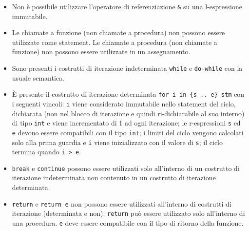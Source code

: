 \documentclass{report}
\newcommand{\term}[1]{\texttt{#1}}
\begin{document}
\begin {itemize}
\begin{itemize}
    \end{itemize}

    La dimensione di un array deve essere una r-espressione valutabile a compile-time,
    compatibile con il tipo intero e di valore positivo.

    Le costanti (\term{param}) sono considerate immutabili e definite a compile-time.
    Devono essere inizializzate solo da letterali o da r-espressioni valutabili
    a compile-time.

    Variabili e costanti sono visibili dal punto di dichiarazione fino alla fine
    del blocco, le funzioni sono visibili ovunque nel blocco di dichiarazione
    e nei blocchi al suo interno.

    Le funzioni (non procedure) devono ammettere un return in ogni path di esecuzione
    possibile.

    \item Non è possibile utilizzare l'operatore di referenziazione \term{&} su una
    l-espressione immutabile.

    \item Le chiamate a funzione (non chiamate a procedura) non possono essere utilizzate come
    statement. Le chiamate a procedura (non chiamate a funzione) non possono essere utilizzate in un
    assegnamento.

    \item Sono presenti i costrutti di iterazione indeterminata \term{while} e
    \term{do-while} con la usuale semantica.

    \item È presente il costrutto di iterazione determinata \texttt{for i in \{s .. e\}~stm}
    con i seguenti vincoli: \texttt{i} viene considerato immutabile nello statement del ciclo,
    dichiarata (non nel blocco di iterazione e quindi ri-dichiarabile al suo interno) di tipo 
    \term{int} e viene incrementato di 1 ad  ogni iterazione; le r-espressioni \texttt{s} 
    ed \texttt{e} devono essere  compatibili con il tipo \term{int}; i limiti del ciclo 
    vengono calcolati solo alla prima guardia e \texttt{i} viene inizializzato con il 
    valore di \texttt{s}; il ciclo termina quando \texttt{i > e}.

    \item \texttt{break} e \texttt{continue} possono essere utilizzati solo all'interno
    di un costrutto di iterazione indeterminata non contenuto in un costrutto di iterazione determinata.

    \item \texttt{return} e \texttt{return e} non possono essere utilizzati all'interno
    di costrutti di iterazione (determinata e non). \texttt{return} può essere utilizzato
    solo all'interno di una procedura. \texttt{e} deve essere compatibile con
    il tipo di ritorno della funzione.


\end{itemize}
\end{document}
